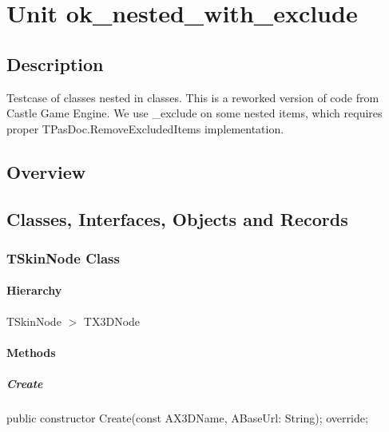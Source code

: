 \documentclass{report}
\begin{document}
\newlength{\tmplength}
\chapter{Unit ok{\_}nested{\_}with{\_}exclude}
\section{Description}
Testcase of classes nested in classes. This is a reworked version of code from Castle Game Engine. We use {\_}exclude on some nested items, which requires proper TPasDoc.RemoveExcludedItems implementation.
\section{Overview}
\begin{description}
\item[\texttt{\begin{ttfamily}TSkinNode\end{ttfamily} Class}]
\end{description}
\section{Classes, Interfaces, Objects and Records}
\subsection*{TSkinNode Class}
\subsubsection*{\large{\textbf{Hierarchy}}\normalsize\hspace{1ex}\hfill}
TSkinNode {$>$} TX3DNode
\subsubsection*{\large{\textbf{Methods}}\normalsize\hspace{1ex}\hfill}
\paragraph*{Create}\hspace*{\fill}

\begin{list}{}{
\setlength{\itemindent}{0cm}
\setlength{\listparindent}{0cm}
\setlength{\leftmargin}{\evensidemargin}
\addtolength{\leftmargin}{\tmplength}
\settowidth{\labelsep}{X}
\addtolength{\leftmargin}{\labelsep}
\setlength{\labelwidth}{\tmplength}
}
\begin{flushleft}
\item[\textbf{Declaration}\hfill]
\begin{ttfamily}
public constructor Create(const AX3DName, ABaseUrl: String); override;\end{ttfamily}


\end{flushleft}
\end{list}
\end{document}

